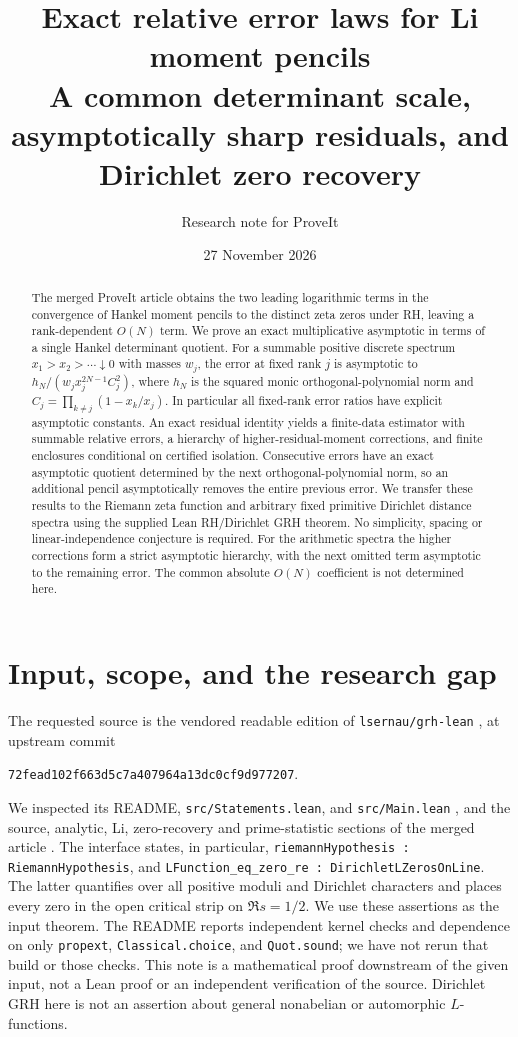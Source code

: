 \documentclass[11pt]{article}
\title{Exact relative error laws for Li moment pencils\\\large A common determinant scale, asymptotically sharp residuals, and Dirichlet zero recovery}
\author{Research note for ProveIt}
\date{27 November 2026}
\theoremstyle{remark}\newtheorem{remark}[theorem]{Remark}
\begin{document}
\maketitle
\begin{abstract}
The merged ProveIt article obtains the two leading logarithmic terms in the convergence of Hankel moment pencils to the distinct zeta zeros under RH, leaving a rank-dependent $O(N)$ term. We prove an exact multiplicative asymptotic in terms of a single Hankel determinant quotient. For a summable positive discrete spectrum $x_1>x_2>\cdots\downarrow0$ with masses $w_j$, the error at fixed rank $j$ is asymptotic to $h_N/(w_j x_j^{2N-1} C_j^2)$, where $h_N$ is the squared monic orthogonal-polynomial norm and $C_j=\prod_{k\ne j}(1-x_k/x_j)$. In particular all fixed-rank error ratios have explicit asymptotic constants. An exact residual identity yields a finite-data estimator with summable relative errors, a hierarchy of higher-residual-moment corrections, and finite enclosures conditional on certified isolation. Consecutive errors have an exact asymptotic quotient determined by the next orthogonal-polynomial norm, so an additional pencil asymptotically removes the entire previous error. We transfer these results to the Riemann zeta function and arbitrary fixed primitive Dirichlet distance spectra using the supplied Lean RH/Dirichlet GRH theorem. No simplicity, spacing or linear-independence conjecture is required. For the arithmetic spectra the higher corrections form a strict asymptotic hierarchy, with the next omitted term asymptotic to the remaining error. The common absolute $O(N)$ coefficient is not determined here.
\end{abstract}

\section{Input, scope, and the research gap}
The requested source is the vendored readable edition of \texttt{lsernau/grh-lean} \cite{vendor}, at upstream commit
\begin{center}\small\texttt{72fead102f663d5c7a407964a13dc0cf9d977207}.\end{center}
We inspected its README, \texttt{src/Statements.lean}, and \texttt{src/Main.lean} \cite{statements,main}, and the source, analytic, Li, zero-recovery and prime-statistic sections of the merged article \cite{article,source,li}. The interface states, in particular, \texttt{riemannHypothesis : RiemannHypothesis}, and \texttt{LFunction\_eq\_zero\_re : DirichletLZerosOnLine}. The latter quantifies over all positive moduli and Dirichlet characters and places every zero in the open critical strip on $\Re s=1/2$. We use these assertions as the input theorem. The README reports independent kernel checks and dependence on only \texttt{propext}, \texttt{Classical.choice}, and \texttt{Quot.sound}; we have not rerun that build or those checks. This note is a mathematical proof downstream of the given input, not a Lean proof or an independent verification of the source. Dirichlet GRH here is not an assertion about general nonabelian or automorphic $L$-functions.
\end{document}
